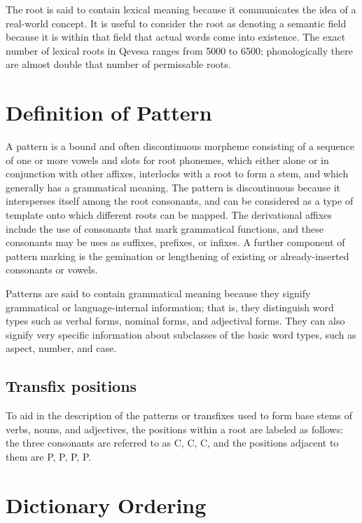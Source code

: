 \documentclass[grammar]{subfiles}
\begin{document}
	The root is said to contain lexical meaning because it communicates the idea of a real-world concept. It is useful to consider the root as denoting a semantic field because it is within that field that actual words come into existence. The exact number of lexical roots in Qevesa ranges from 5000 to 6500; phonologically there are almost double that number of permissable roots.

	\section{Definition of Pattern}
	\label{sec:definition_of_pattern}

	A pattern is a bound and often discontinuous morpheme consisting of a sequence of one or more vowels and slots for root phonemes, which either alone or in conjunction with other affixes, interlocks with a root to form a stem, and which generally has a grammatical meaning. The pattern is discontinuous because it intersperses itself among the root consonants, and can be considered as a type of template onto which different roots can be mapped. The derivational affixes include the use of consonants that mark grammatical functions, and	these consonants may be uses as suffixes, prefixes, or infixes. A further component of pattern marking is the gemination or lengthening of existing or already-inserted consonants or vowels.

	Patterns are said to contain grammatical meaning because they signify grammatical or language-internal information; that is, they distinguish word types such as verbal forms, nominal forms, and adjectival forms. They can also signify very specific information about subclasses of the basic word types, such as aspect, number, and case.

	\subsection{Transfix positions}
	\label{ssec:transfix_positions}

	To aid in the description of the patterns or transfixes used to form base stems of verbs, nouns, and adjectives, the positions within a root are labeled as follows: the three consonants are referred to as C, C, C, and the positions adjacent to them are P, P, P, P.
	
	\section{Dictionary Ordering}
	\label{sec:dictionary_ordering}
\end{document}
